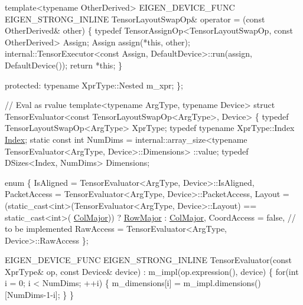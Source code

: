 \begin{DoxyCodeInclude}
    \textcolor{keyword}{template}<\textcolor{keyword}{typename} OtherDerived>
    EIGEN\_DEVICE\_FUNC
    EIGEN\_STRONG\_INLINE TensorLayoutSwapOp& operator = (\textcolor{keyword}{const} OtherDerived& other)
    \{
      \textcolor{keyword}{typedef} TensorAssignOp<TensorLayoutSwapOp, const OtherDerived> Assign;
      Assign assign(*\textcolor{keyword}{this}, other);
      internal::TensorExecutor<const Assign, DefaultDevice>::run(assign, DefaultDevice());
      \textcolor{keywordflow}{return} *\textcolor{keyword}{this};
    \}

  \textcolor{keyword}{protected}:
    \textcolor{keyword}{typename} XprType::Nested m\_xpr;
\};


\textcolor{comment}{// Eval as rvalue}
\textcolor{keyword}{template}<\textcolor{keyword}{typename} ArgType, \textcolor{keyword}{typename} Device>
\textcolor{keyword}{struct }TensorEvaluator<const TensorLayoutSwapOp<ArgType>, Device>
\{
  \textcolor{keyword}{typedef} TensorLayoutSwapOp<ArgType> XprType;
  \textcolor{keyword}{typedef} \textcolor{keyword}{typename} XprType::Index \hyperlink{namespace_eigen_a62e77e0933482dafde8fe197d9a2cfde}{Index};
  \textcolor{keyword}{static} \textcolor{keyword}{const} \textcolor{keywordtype}{int} NumDims = internal::array\_size<typename TensorEvaluator<ArgType, Device>::Dimensions>
      ::value;
  \textcolor{keyword}{typedef} DSizes<Index, NumDims> Dimensions;

  \textcolor{keyword}{enum} \{
    IsAligned = TensorEvaluator<ArgType, Device>::IsAligned,
    PacketAccess = TensorEvaluator<ArgType, Device>::PacketAccess,
    Layout = (\textcolor{keyword}{static\_cast<}\textcolor{keywordtype}{int}\textcolor{keyword}{>}(TensorEvaluator<ArgType, Device>::Layout) == static\_cast<int>(
      \hyperlink{group__enums_ggaacded1a18ae58b0f554751f6cdf9eb13a0cbd4bdd0abcfc0224c5fcb5e4f6669a}{ColMajor})) ? \hyperlink{group__enums_ggaacded1a18ae58b0f554751f6cdf9eb13acfcde9cd8677c5f7caf6bd603666aae3}{RowMajor} : \hyperlink{group__enums_ggaacded1a18ae58b0f554751f6cdf9eb13a0cbd4bdd0abcfc0224c5fcb5e4f6669a}{ColMajor},
    CoordAccess = \textcolor{keyword}{false},  \textcolor{comment}{// to be implemented}
    RawAccess = TensorEvaluator<ArgType, Device>::RawAccess
  \};

  EIGEN\_DEVICE\_FUNC EIGEN\_STRONG\_INLINE TensorEvaluator(\textcolor{keyword}{const} XprType& op, \textcolor{keyword}{const} Device& device)
      : m\_impl(op.expression(), device)
  \{
    \textcolor{keywordflow}{for}(\textcolor{keywordtype}{int} i = 0; i < NumDims; ++i) \{
      m\_dimensions[i] = m\_impl.dimensions()[NumDims-1-i];
    \}
  \}


\end{DoxyCodeInclude}
